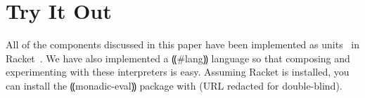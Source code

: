 \section{Try It Out}\label{s:try-it}

All of the components discussed in this paper have been implemented as
units~\cite{local:flatt-pldi98} in Racket~\cite{dvanhorn:plt-tr1}.  We have
also implemented a ⸨#lang⸩ language so that composing and experimenting with
these interpreters is easy.  Assuming Racket is installed, you can install the
⸨monadic-eval⸩ package with (URL redacted for double-blind).

